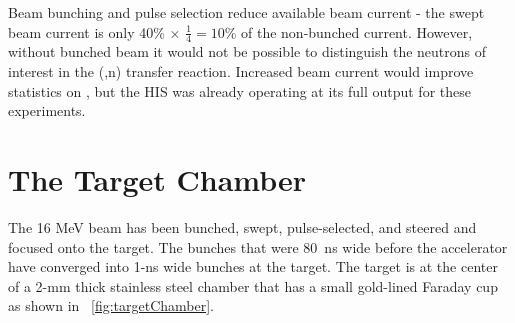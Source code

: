 Beam bunching and pulse selection reduce available beam current - the swept beam current is only 40\% $\times$ $\frac{1}{4} = 10$\% of the non-bunched current.  However, without bunched beam it would not be possible to distinguish the neutrons of interest in the (,n) transfer reaction.  Increased beam current would improve statistics on \reaction, but the HIS was already operating at its full output for these experiments.

\section{The Target Chamber}

The 16 MeV  beam has been bunched, swept, pulse-selected, and steered and focused onto the target.  The bunches that were 80~ns wide before the accelerator have converged into 1-ns wide bunches at the target.  The target is at the center of a 2-mm thick stainless steel chamber that has a small gold-lined Faraday cup as shown in {\fig}~\ref{fig:targetChamber}.

